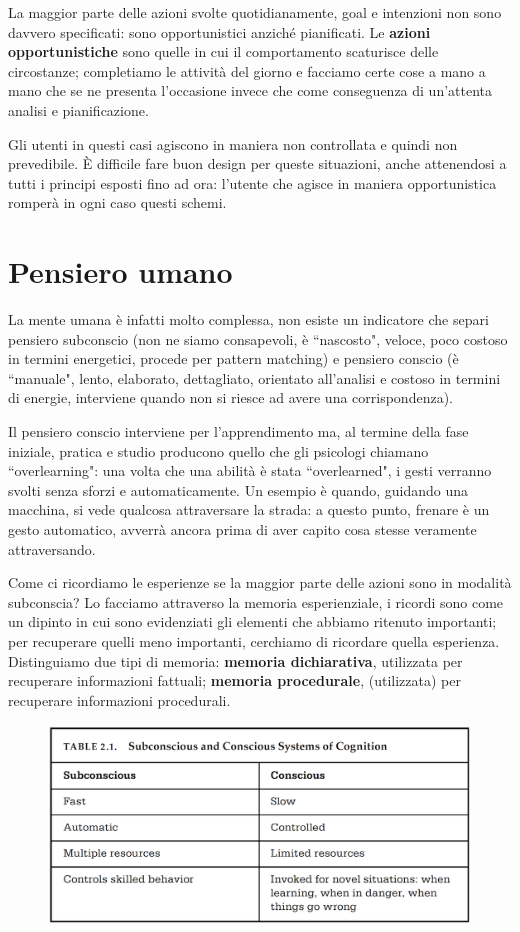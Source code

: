 La maggior parte delle azioni svolte quotidianamente, goal e intenzioni non sono davvero specificati: sono opportunistici anziché pianificati.
Le \textbf{azioni opportunistiche} sono quelle in cui il comportamento scaturisce delle circostanze; completiamo le attività del giorno e facciamo
certe cose a mano a mano che se ne presenta l'occasione invece che come conseguenza di un'attenta analisi e pianificazione.

Gli utenti in questi casi agiscono in maniera non controllata e quindi non prevedibile. È difficile fare buon design per queste situazioni,
anche attenendosi a tutti i principi esposti fino ad ora: l'utente che agisce in maniera opportunistica romperà in ogni caso questi schemi.

\section{Pensiero umano}
La mente umana è infatti molto complessa, non esiste un indicatore che separi pensiero subconscio (non ne siamo consapevoli, è ``nascosto", veloce,
poco costoso in termini energetici, procede per pattern matching) e pensiero conscio (è ``manuale", lento, elaborato, dettagliato, orientato all'analisi
e costoso in termini di energie, interviene quando non si riesce ad avere una corrispondenza).

Il pensiero conscio interviene per l'apprendimento ma, al termine della fase iniziale, pratica e studio producono quello che gli psicologi chiamano
``overlearning": una volta che una abilità è stata ``overlearned", i gesti verranno svolti senza sforzi e automaticamente. Un esempio è quando, guidando
una macchina, si vede qualcosa attraversare la strada: a questo punto, frenare è un gesto automatico, avverrà ancora prima di aver capito cosa stesse
veramente attraversando.

Come ci ricordiamo le esperienze se la maggior parte delle azioni sono in modalità subconscia? Lo facciamo attraverso la memoria esperienziale, i
ricordi sono come un dipinto in cui sono evidenziati gli elementi che abbiamo ritenuto importanti; per recuperare quelli meno importanti, cerchiamo
di ricordare quella esperienza. Distinguiamo due tipi di memoria: \textbf{memoria dichiarativa}, utilizzata per recuperare informazioni fattuali;
\textbf{memoria procedurale}, (utilizzata) per recuperare informazioni procedurali.

\begin{figure}[!h]
	\centering
	\includegraphics[scale=0.27]{immagini/subconscio-conscio.png}
\end{figure}

